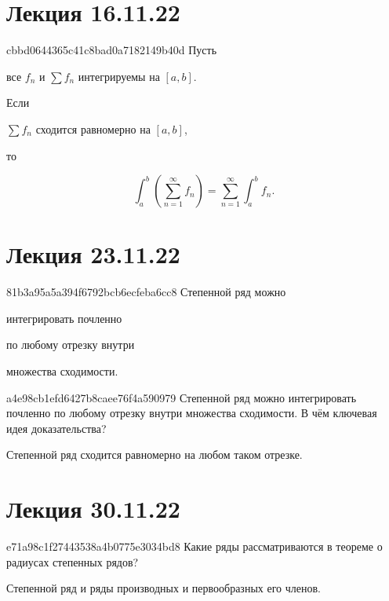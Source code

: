 \section{Лекция 16.11.22}
\begin{note}{cbbd0644365c41c8bad0a7182149b40d}
    Пусть \begin{icloze}{3}все \({ f_n }\) и \({ \sum f_n }\) интегрируемы на \({ [a, b] }\).\end{icloze}
    Если \begin{icloze}{2}\({ \sum f_n }\) сходится равномерно на \({ [a, b] }\),\end{icloze} то
    \begin{icloze}{1}
        \[
            \int_{a}^{b} \left( \sum_{n=1}^{\infty} f_n \right) = \sum_{n=1}^{\infty} \int_{a}^{b} f_n.
        \]
    \end{icloze}
\end{note}

\section{Лекция 23.11.22}
\begin{note}{81b3a95a5a394f6792bcb6ecfeba6cc8}
    Степенной ряд можно \begin{icloze}{2}интегрировать почленно\end{icloze} по любому отрезку внутри \begin{icloze}{1}множества сходимости.\end{icloze}
\end{note}

\begin{note}{a4e98cb1efd6427b8caee76f4a590979}
    Степенной ряд можно интегрировать почленно по любому отрезку внутри множества сходимости.
    В чём ключевая идея доказательства?

    \begin{cloze}{1}
        Степенной ряд сходится равномерно на любом таком отрезке.
    \end{cloze}
\end{note}

\section{Лекция 30.11.22}
\begin{note}{e71a98c1f27443538a4b0775e3034bd8}
    Какие ряды рассматриваются в теореме о радиусах степенных рядов?

    \begin{cloze}{1}
        Степенной ряд и ряды производных и первообразных его членов.
    \end{cloze}
\end{note}

